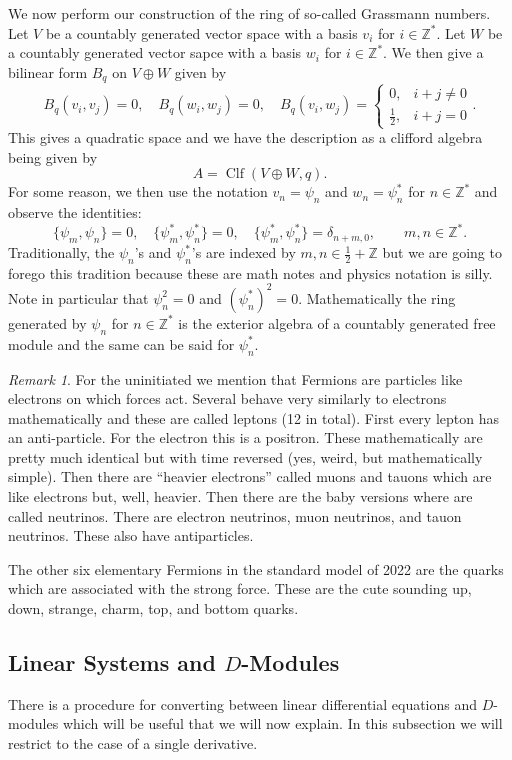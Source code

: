 \documentclass[12pt]{book}
\numberwithin{equation}{section}
\theoremstyle{definition}
\theoremstyle{remark}
\newtheorem{remark}[theorem]{Remark}
\newcommand{\ZZ}{\mathbb{Z}}
\newcommand{\Clf}{\operatorname{Clf}}
\begin{document}
We now perform our construction of the ring of so-called Grassmann numbers.  
Let $V$ be a countably generated vector space with a basis $v_i$ for $i\in \ZZ^*$. 
Let $W$ be a countably generated vector sapce with a basis $w_i$ for $i\in \ZZ^*$. 
We then give a bilinear form $B_q$ on $V\oplus W$ given by
$$ B_q(v_i,v_j)=0, \quad B_q(w_i,w_j)=0, \quad B_q(v_i,w_j) = \begin{cases}
0, & i+j\neq 0 \\
\frac{1}{2}, & i+j=0
\end{cases}.$$
This gives a quadratic space and we have the description as a clifford algebra being given by 
$$ A = \Clf( V\oplus W, q).$$
For some reason, we then use the notation $v_n=\psi_n$ and $w_n=\psi^*_n$ for $n\in \ZZ^*$ and observe the identities:
 $$\lbrace \psi_m,\psi_n \rbrace =0, \quad \lbrace \psi_m^*,\psi_n^* \rbrace =0, \quad \lbrace \psi_{m}^*,\psi_n^*\rbrace = \delta_{n+m,0}, \qquad m,n\in \ZZ^*.$$
Traditionally, the $\psi_n$'s and $\psi_n^*$'s are indexed by $m,n \in \frac{1}{2}+\ZZ$ but we are going to forego this tradition because these are math notes and physics notation is silly. 
Note in particular that $\psi_n^2=0$ and $(\psi_n^*)^2=0$.
Mathematically the ring generated by $\psi_n$ for $n \in \ZZ^*$ is the exterior algebra of a countably generated free module and the same can be said for $\psi_n^*$. 

\begin{remark}
For the uninitiated we mention that Fermions are particles like electrons on which forces act. 
Several behave very similarly to electrons mathematically and these are called leptons (12 in total). 
First every lepton has an anti-particle. 
For the electron this is a positron. 
These mathematically are pretty much identical but with time reversed (yes, weird, but mathematically simple). 
Then there are ``heavier electrons'' called muons and tauons which are like electrons but, well,  heavier.
Then there are the baby versions where are called neutrinos.
There are electron neutrinos, muon neutrinos, and tauon neutrinos.
These also have antiparticles. 

The other six elementary Fermions in the standard model of 2022 are the quarks which are associated with the strong force. These are the cute sounding up, down, strange, charm, top, and bottom quarks.
\end{remark}

\subsection{Linear Systems and $D$-Modules}
There is a procedure for converting between linear differential equations and $D$-modules which will be useful that we will now explain. 
In this subsection we will restrict to the case of a single derivative.
\end{document}
